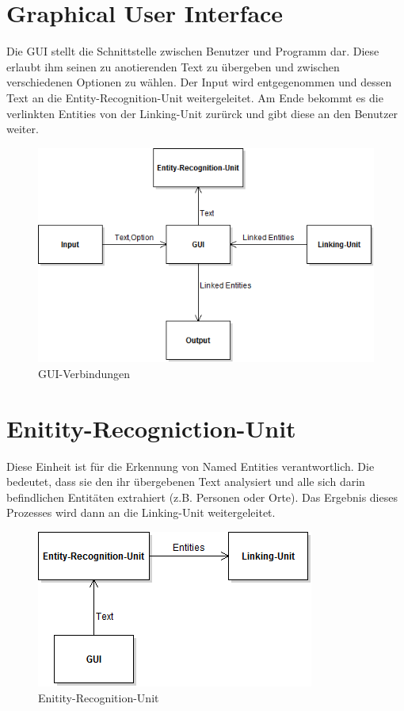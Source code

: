 \documentclass[11pt, a4paper, oneside]{Thesis} %
\begin{document}
\section{Graphical User Interface}
Die GUI stellt die Schnittstelle zwischen Benutzer und Programm dar. Diese erlaubt ihm seinen zu anotierenden Text zu \"ubergeben und zwischen verschiedenen Optionen zu w\"ahlen. Der Input wird entgegenommen und dessen Text an die Entity-Recognition-Unit weitergeleitet. Am Ende bekommt es die verlinkten Entities von der Linking-Unit zur\"urck und gibt diese an den Benutzer weiter.
\begin{figure}[!ht]
\centering
\includegraphics[scale=0.55]{./GUI.png}
\caption[GUI]{GUI-Verbindungen}
\end{figure}


\section{Enitity-Recogniction-Unit}
Diese Einheit ist f\"ur die Erkennung von Named Entities verantwortlich. Die bedeutet, dass sie den ihr \"ubergebenen Text analysiert und alle sich darin befindlichen Entit\"aten extrahiert (z.B. Personen oder Orte). Das Ergebnis dieses Prozesses wird dann an die Linking-Unit weitergeleitet.
\begin{figure}[ht!]
\centering
\includegraphics[scale=0.55]{./eeu.png}
\caption[EEnitity-Recognition-Unit]{Enitity-Recognition-Unit}
\end{figure}
\end{document}
